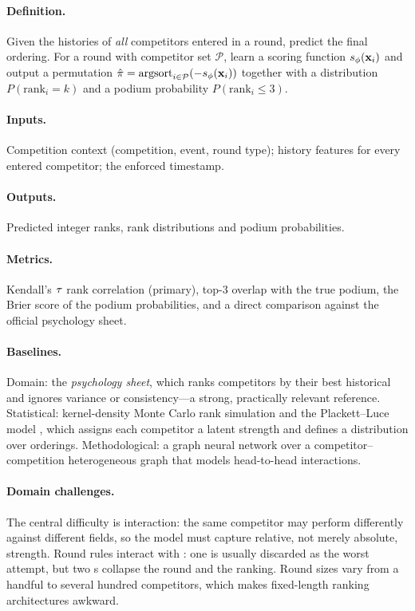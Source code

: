 \paragraph{Definition.}
Given the histories of \emph{all} competitors entered in a round, predict the
final ordering. For a round with competitor set $\mathcal{P}$, learn a scoring
function $s_\phi(\mathbf{x}_i)$ and output a permutation
$\hat{\pi} = \mathrm{argsort}_{i \in \mathcal{P}}(-s_\phi(\mathbf{x}_i))$ together with
a distribution $P(\mathrm{rank}_i = k)$ and a podium probability
$P(\mathrm{rank}_i \le 3)$.

\paragraph{Inputs.}
Competition context (competition, event, round type); history features for
every entered competitor; the enforced \asof{} timestamp.

\paragraph{Outputs.}
Predicted integer ranks, rank distributions and podium probabilities.

\paragraph{Metrics.}
Kendall's $\tau$ rank correlation (primary), top-3 overlap with the true
podium, the Brier score of the podium probabilities, and a direct comparison
against the official \wca{} psychology sheet.

\paragraph{Baselines.}
Domain: the \wca{} \emph{psychology sheet}, which ranks competitors by their
best historical  and ignores variance or consistency---a strong,
practically relevant reference. Statistical: kernel-density Monte Carlo rank
simulation and the Plackett--Luce model \citep{plackett_luce}, which assigns
each competitor a latent strength and defines a distribution over orderings.
Methodological: a graph neural network over a competitor--competition
heterogeneous graph that models head-to-head interactions.

\paragraph{Domain challenges.}
The central difficulty is interaction: the same competitor may perform
differently against different fields, so the model must capture relative, not
merely absolute, strength. Round rules interact with \DNF{}: one \DNF{} is
usually discarded as the worst  attempt, but two \DNF{}s collapse the
round and the ranking. Round sizes vary from a handful to several hundred
competitors, which makes fixed-length ranking architectures awkward.

